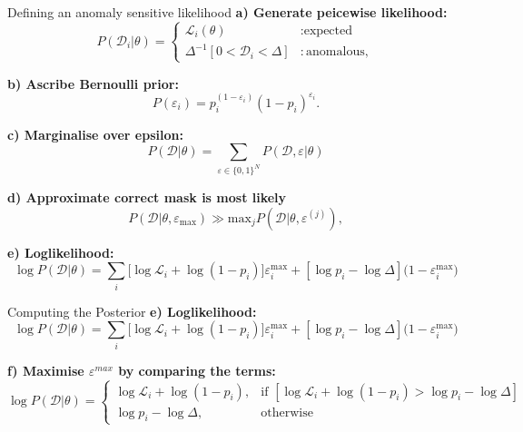 \documentclass[aspectratio=169]{beamer}
\begin{document}
\begin{frame}{Defining an anomaly sensitive likelihood}
  \footnotesize
  \textbf{a) Generate peicewise likelihood:}
  \begin{equation}
      P(\mathcal{D}_i|\theta) = \begin{cases}
          \mathcal{L}_i(\theta) &: \text{expected}\\
          \Delta^{-1}[ 0<\mathcal{D}_i<\Delta] &: \text{anomalous},
      \end{cases}
  \end{equation}

  \textbf{b) Ascribe Bernoulli prior:}
  \begin{equation}
      P(\varepsilon_i) = p_i^{(1-\varepsilon_i)}(1-p_i)^{\varepsilon_i}.
  \end{equation}

  \textbf{c) Marginalise over epsilon:}
  \begin{equation}
      P(\mathcal{D} | \theta) =\sum_{\varepsilon \in \{ 0, 1 \} ^N}P(\mathcal{D},\varepsilon|\theta)
    \end{equation}


    \textbf{d) Approximate correct mask is most likely}
     \begin{equation}
 P(\mathcal{D}|\theta, \varepsilon_{\mathrm{max}}) \gg \mathrm{max}_j P(\mathcal{D}|\theta,\varepsilon^{(j)})\label{eq:nlo},
\end{equation}

  \textbf{e) Loglikelihood:}
  \begin{equation}
      \log{P(\mathcal{D}|\theta)} = \sum_{i}[{\log{\mathcal{L}_i}+\log({1-p_i})]\varepsilon^{\mathrm{max}}_i + [\log{p}_i - \log{\Delta}](1 - \varepsilon^\mathrm{max}_i})
  \end{equation}
\end{frame}

\begin{frame}{Computing the Posterior}
    \footnotesize
    \textbf{e) Loglikelihood:}
  \begin{equation}\tag{6}
      \log{P(\mathcal{D}|\theta)} = \sum_{i}[{\log{\mathcal{L}_i}+\log({1-p_i})]\varepsilon^{\mathrm{max}}_i + [\log{p}_i - \log{\Delta}](1 - \varepsilon^\mathrm{max}_i})
  \end{equation}

    \footnotesize
    \textbf{f) Maximise $\varepsilon^{max}$ by comparing the terms:}
    \begin{equation}\tag{7}
    \log P(\mathcal{D}|\theta) =
    \begin{cases} 
    \log \mathcal{L}_i + \log(1 - p_i), & \text{if } [\log \mathcal{L}_i + \log(1 - p_i) > \log p_i - \log \Delta] \\
    \log p_i - \log \Delta, & \text{otherwise}
    \end{cases}
    \end{equation}
\end{frame}
\end{document}
